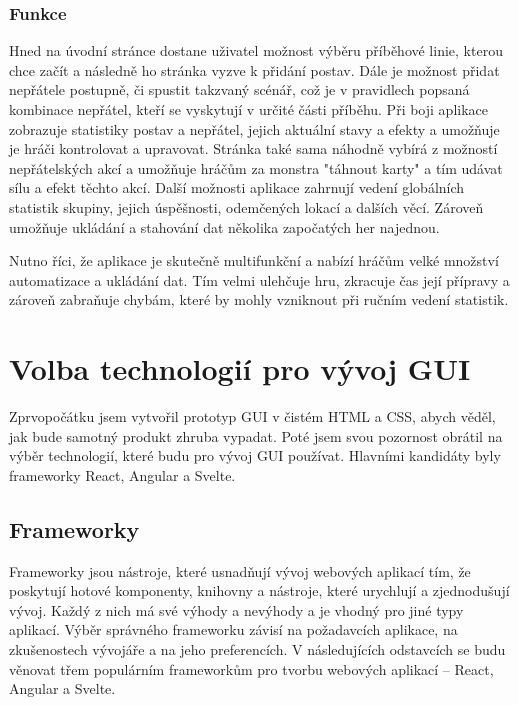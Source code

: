 \subsubsection*{Funkce}
Hned na úvodní stránce dostane uživatel možnost výběru příběhové linie, kterou chce začít a následně ho stránka vyzve k přidání postav. Dále je možnost přidat nepřátele postupně, či spustit takzvaný scénář, což je v pravidlech popsaná kombinace nepřátel, kteří se vyskytují v určité části příběhu. Při boji aplikace zobrazuje statistiky postav a nepřátel, jejich aktuální stavy a efekty a umožňuje je hráči kontrolovat a upravovat. Stránka také sama náhodně vybírá z možností nepřátelských akcí a umožňuje hráčům za monstra "táhnout karty" a tím udávat sílu a efekt těchto akcí. Další možnosti aplikace zahrnují vedení globálních statistik skupiny, jejich úspěšnosti, odemčených lokací a dalších věcí. Zároveň umožňuje ukládání a stahování dat několika započatých her najednou.

Nutno říci, že aplikace je skutečně multifunkční a nabízí hráčům velké množství automatizace a ukládání dat. Tím velmi ulehčuje hru, zkracuje čas její přípravy a zároveň zabraňuje chybám, které by mohly vzniknout při ručním vedení statistik.
\pagebreak

\section{Volba technologií pro vývoj GUI}
Zprvopočátku jsem vytvořil prototyp GUI v čistém HTML a CSS, abych věděl, jak bude samotný produkt zhruba vypadat. Poté jsem svou pozornost obrátil na výběr technologií, které budu pro vývoj GUI používat. Hlavními kandidáty byly frameworky React, Angular a Svelte.

\subsection{Frameworky}
Frameworky jsou nástroje, které usnadňují vývoj webových aplikací tím, že poskytují hotové komponenty, knihovny a nástroje, které urychlují a zjednodušují vývoj. Každý z nich má své výhody a nevýhody a je vhodný pro jiné typy aplikací. Výběr správného frameworku závisí na požadavcích aplikace, na zkušenostech vývojáře a na jeho preferencích. V následujících odstavcích se budu věnovat třem populárním frameworkům pro tvorbu webových aplikací -- React, Angular a Svelte.

